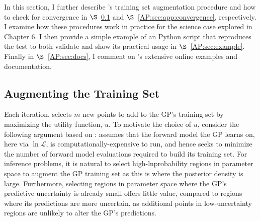 In this section, I further describe \approxposterior's training set augmentation procedure and how to check for convergence in $\S$~\ref{AP:sec:augment} and $\S$~\ref{AP:sec:app:convergence}, respectively. I examine how these procedures work in practice for the science case explored in Chapter 6.  I then provide a simple example of an \approxposterior Python script that reproduces the \citet{Wang2018} test to both validate \approxposterior and show its practical usage in $\S$~\ref{AP:sec:example}. Finally in $\S$~\ref{AP:sec:docs}, I comment on \approxposterior's extensive online examples and documentation.

\subsection{Augmenting the Training Set} \label{AP:sec:augment}

Each iteration, \approxposterior selects $m$ new points to add to the GP's training set by maximizing the utility function, $u$. To motivate the choice of $u$, consider the following argument based on \citet{Kandasamy2017}: \approxposterior assumes that the forward model the GP learns on, here \vplanet via $\ln \mathcal{L}$, is computationally-expensive to run, and hence \approxposterior seeks to minimize the number of forward model evaluations required to build its training set. For inference problems, it is natural to select high-lnprobability regions in parameter space to augment the GP training set as this is where the posterior density is large. Furthermore, selecting regions in parameter space where the GP's predictive uncertainty is already small offers little value, compared to regions where its predictions are more uncertain, as additional points in low-uncertainty regions are unlikely to alter the GP's predictions. 

